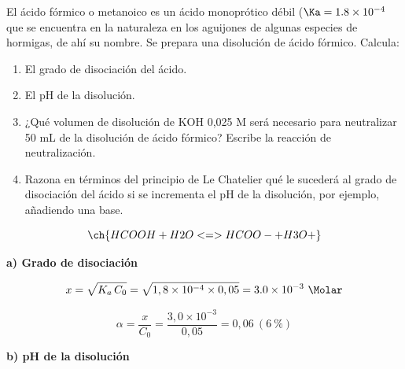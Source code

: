 \begin{exerciseEVAU}
    El ácido fórmico o metanoico es un ácido monoprótico débil (\(\Ka = \num{1.8e-4}\) que se encuentra en la naturaleza en los aguijones de algunas especies de hormigas, de ahí su nombre. Se prepara una disolución   de ácido fórmico. Calcula:
    \begin{enumerate}[label=\letraminuscula]
        \item El grado de disociación del ácido.
        \item El pH de la disolución.
        \item ¿Qué volumen de disolución de KOH 0,025 M será necesario para neutralizar 50 mL de la disolución de ácido fórmico? Escribe la reacción de neutralización.
        \item Razona en términos del principio de Le Chatelier qué le sucederá al grado de disociación del ácido si se incrementa el pH de la disolución, por ejemplo, añadiendo una base.
    \end{enumerate}



    \begin{solu}


        \begin{equation*}
            \ch{HCOOH + H2O <=> HCOO- + H3O+}
        \end{equation*}

        \textbf{a) Grado de disociación}

        \begin{equation*}
            x = \sqrt{K_a\, C_0} = \sqrt{1,8\times10^{-4}\times0,05} = \num{3.0e-3} \ \si{\Molar}
        \end{equation*}

        \begin{equation*}
            \alpha = \dfrac{x}{C_0} = \dfrac{3,0\times10^{-3}}{0,05} = 0,06 \ (6\ \%)
        \end{equation*}

        \textbf{b) pH de la disolución}


\end{solu}
\end{exerciseEVAU}
